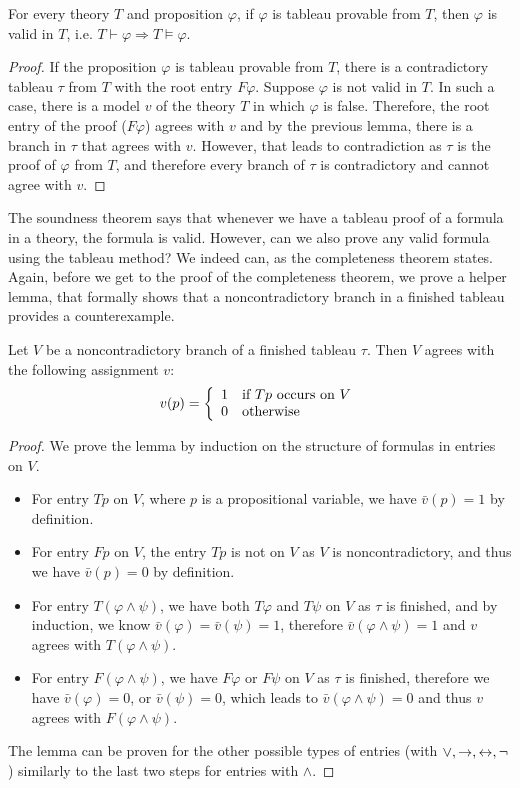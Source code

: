 \begin{theorem}
For every theory $T$ and proposition $\varphi$, if $\varphi$ is tableau provable from $T$, then $\varphi$ is valid in $T$, i.e. $T \vdash \varphi \Rightarrow T \vDash \varphi$.
\end{theorem}
\begin{proof}
If the proposition $\varphi$ is tableau provable from $T$, there is a contradictory tableau $\tau$ from $T$ with the root entry $F \varphi$. Suppose $\varphi$ is not valid in $T$. In such a case, there is a model $v$ of the theory $T$ in which $\varphi$ is false. Therefore, the root entry of the proof ($F \varphi$) agrees with $v$ and by the previous lemma, there is a branch in $\tau$ that agrees with $v$. However, that leads to contradiction as $\tau$ is the proof of $\varphi$ from $T$, and therefore every branch of $\tau$ is contradictory and cannot agree with $v$.
\end{proof}

The soundness theorem says that whenever we have a tableau proof of a formula in a theory, the formula is valid. However, can we also prove any valid formula using the tableau method? We indeed can, as the completeness theorem states. Again, before we get to the proof of the completeness theorem, we prove a helper lemma, that formally shows that a noncontradictory branch in a finished tableau provides a counterexample.

\begin{lemma}
Let $V$ be a noncontradictory branch of a finished tableau $\tau$. Then $V$ agrees with the following assignment $v$: $$v(p) = \left\{ \begin{array}{ll} 1 & \text{if } Tp \text{ occurs on } V \\ 0 & \text{otherwise} \end{array} \right.$$
\end{lemma}
\begin{proof}
We prove the lemma by induction on the structure of formulas in entries on $V$.
\begin{itemize}
 \item For entry $T p$ on $V$, where $p$ is a propositional variable, we have $\bar{v}(p)= 1$ by definition.
 \item For entry $F p$ on $V$, the entry $T p$ is not on $V$ as $V$ is noncontradictory, and thus we have $\bar{v}(p) = 0$ by definition.
 \item For entry $T (\varphi \land \psi)$, we have both $T \varphi$ and $T \psi$ on $V$ as $\tau$ is finished, and by induction, we know $\bar{v}(\varphi)=\bar{v}(\psi)=1$, therefore $\bar{v}(\varphi \land \psi)=1$ and $v$ agrees with $T (\varphi \land \psi)$.
 \item For entry $F (\varphi \land \psi)$, we have $F \varphi$ or $F \psi$ on $V$ as $\tau$ is finished, therefore we have $\bar{v}(\varphi) = 0$, or $\bar{v}(\psi) = 0$, which leads to $\bar{v}(\varphi \land \psi) = 0$ and thus $v$ agrees with $F (\varphi \land \psi)$.
\end{itemize}

The lemma can be proven for the other possible types of entries (with $\lor, \to, \leftrightarrow, \neg$) similarly to the last two steps for entries with $\land$.
\end{proof}

